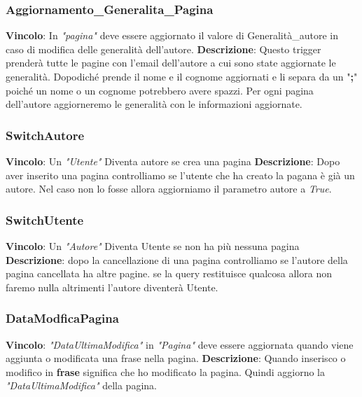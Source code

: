 \newpage
\hypertarget{AggiornamentoGeneralitaPagina}{}
\subsubsection{Aggiornamento\_Generalita\_Pagina}
\textbf{Vincolo}: In \textit{"pagina"} deve essere aggiornato il valore di Generalità\_autore in caso di modifica delle generalità dell'autore. \newline\newline
\textbf{Descrizione}: Questo trigger prenderà tutte le pagine con l'email dell'autore a cui sono state aggiornate le generalità. Dopodiché prende il nome e il cognome aggiornati e li separa da un "\textbf{;}" poiché un nome o un cognome potrebbero avere spazzi. Per ogni pagina dell'autore aggiorneremo le generalità con le informazioni aggiornate.\newline


\newpage
\hypertarget{SwitchAutore}{}
\subsubsection{SwitchAutore}
\textbf{Vincolo}: Un \textit{"Utente"} Diventa autore se crea una pagina \newline\newline
\textbf{Descrizione}: Dopo aver inserito una pagina controlliamo se l'utente che ha creato la pagana è già un autore. Nel caso non lo fosse allora aggiorniamo il parametro autore a \textit{True}.



\hypertarget{SwitchUtente}{}
\subsubsection{SwitchUtente}
\textbf{Vincolo}: Un \textit{"Autore"} Diventa Utente se non ha più nessuna pagina \newline\newline
\textbf{Descrizione}: dopo la cancellazione di una pagina controlliamo se l'autore della pagina cancellata ha altre pagine. se la query restituisce qualcosa allora non faremo nulla altrimenti l'autore diventerà Utente.\newline


\newpage
\hypertarget{DataModficaPagina}{}
\subsubsection{DataModficaPagina}
\textbf{Vincolo}: \textit{"DataUltimaModifica"} in \textit{"Pagina"} deve essere aggiornata quando viene aggiunta o modificata una frase nella pagina. \newline\newline
\textbf{Descrizione}: Quando inserisco o modifico in \textbf{frase} significa che ho modificato la pagina. Quindi aggiorno la \textit{"DataUltimaModifica"} della pagina.\newline



